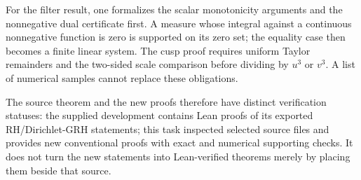 \documentclass[11pt]{article}
\theoremstyle{definition}\newtheorem{definition}[theorem]{Definition}
\theoremstyle{remark}\newtheorem{remark}[theorem]{Remark}
\begin{document}
For the filter result, one formalizes the scalar monotonicity arguments and
the nonnegative dual certificate first. A measure whose integral against a
continuous nonnegative function is zero is supported on its zero set; the
equality case then becomes a finite linear system. The cusp proof requires
uniform Taylor remainders and the two-sided scale comparison before dividing
by $u^3$ or $v^3$. A list of numerical samples cannot replace these obligations.

The source theorem and the new proofs therefore have distinct verification
statuses: the supplied development contains Lean proofs of its exported
RH/Dirichlet-GRH statements; this task inspected selected source files and
provides new conventional proofs with exact and numerical supporting checks.
It does not turn the new statements into Lean-verified theorems merely by
placing them beside that source.


\end{document}
